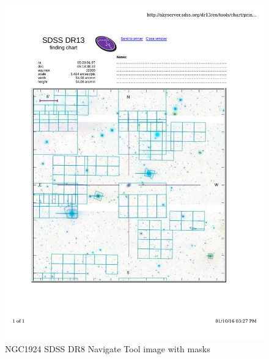 \documentclass[10pt,letterpaper]{article}
\begin{document}
\begin{figure}[h!]
\centering
\includegraphics[scale=0.7]{figures/NGC1924.pdf}
\caption{NGC1924 SDSS DR8 Navigate Tool image with masks}
\end{figure}
\end{document}

